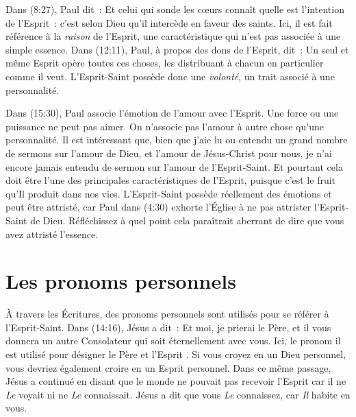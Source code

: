 Dans (8:27), Paul dit~: \og Et celui qui sonde les cœurs
 connaît quelle est l'intention de l'Esprit~: c'est selon Dieu qu'il
 intercède en faveur des saints. \fg{} Ici, il est fait référence
 à la \emph{raison} de l'Esprit, une caractéristique qui n'est pas associée à
 une simple essence. Dans (12:11), Paul, à propos des dons de
 l'Esprit, dit~: \og Un seul et même Esprit opère toutes ces choses, les
 distribuant à chacun en particulier comme il veut. \fg{} L'Esprit-Saint
 possède donc une \emph{volonté}, un trait associé à une personnalité.

Dans (15:30), Paul associe l'émotion de l'amour avec l'Es\-prit.
 Une force ou une puissance ne peut pas aimer. On n'associe pas l'amour à autre
 chose qu'une personnalité. Il est intéressant que, bien que j'aie lu ou
 entendu un grand nombre de sermons sur l'amour de Dieu, et l'amour de
 Jésus-Christ pour nous, je n'ai encore jamais entendu de sermon sur l'amour de
 l'Esprit-Saint. Et pourtant cela doit être l'une des principales
 caractéristiques de l'Esprit, puisque c'est le fruit qu'Il produit dans nos
 vies.                                    
 L'Esprit-Saint possède réellement des émotions et peut être attristé,
 car Paul dans (4:30) exhorte l'Église à ne pas attrister
 l'Esprit-Saint de Dieu. Réfléchissez à quel point cela paraîtrait aberrant
 de dire que vous avez attristé l'essence.


\section{Les pronoms personnels}

À travers les Écritures, des pronoms personnels sont utilisés pour se
 référer à l'Esprit-Saint. Dans (14:16), Jésus a dit~:
 \og Et moi, je prierai le Père, et il vous donnera un autre Consolateur
 qui soit éternellement avec vous. \fg{}
 Ici, le pronom \og il \fg{} est utilisé pour désigner le Père et l'Esprit
 .
 Si vous croyez en un Dieu personnel, vous devriez également croire en
 un Esprit personnel. Dans ce même passage, Jésus a continué en disant
 que le monde ne pouvait pas recevoir l'Esprit car il ne \emph{Le} voyait ni
 ne \emph{Le} connaissait. Jésus a dit que vous \emph{Le} connaissez,
 car \emph{Il} habite en vous.

